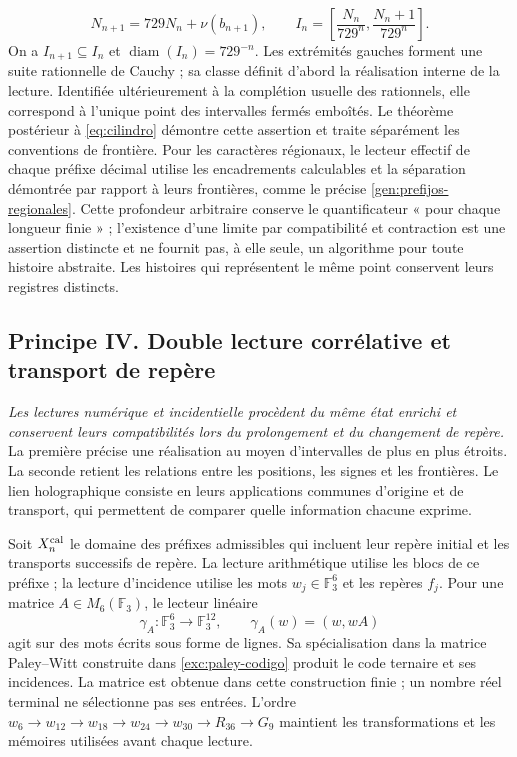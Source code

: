 \[
 N_{n+1}=729N_n+\nu(b_{n+1}),\qquad
 I_n=\left[\frac{N_n}{729^n},\frac{N_n+1}{729^n}\right].
\]
On a \(I_{n+1}\subseteq I_n\) et
\(\operatorname{diam}(I_n)=729^{-n}\). Les extrémités gauches forment
une suite rationnelle de Cauchy ; sa classe définit d’abord la réalisation
interne de la lecture. Identifiée ultérieurement à la complétion
usuelle des rationnels, elle correspond à l’unique point des intervalles
fermés emboîtés. Le théorème postérieur à \eqref{eq:cilindro} démontre
cette assertion et traite séparément les conventions de frontière. Pour
les caractères régionaux, le lecteur effectif de chaque préfixe décimal
utilise les encadrements calculables et la séparation démontrée par rapport à
leurs frontières, comme le précise \cref{gen:prefijos-regionales}. Cette profondeur
arbitraire conserve le quantificateur « pour chaque longueur finie » ;
l’existence d’une limite par compatibilité et contraction est une assertion
distincte et ne fournit pas, à elle seule, un algorithme pour toute histoire
abstraite. Les histoires qui représentent le même point conservent leurs
registres distincts.

\subsection*{Principe IV. Double lecture corrélative et transport de repère
}
\hypertarget{prinh:doble}{}

\emph{Les lectures numérique et incidentielle procèdent du même état
enrichi et conservent leurs compatibilités lors du prolongement et du changement de
repère.} La première précise une réalisation au moyen d’intervalles de plus en plus
étroits. La seconde retient les relations entre les positions, les signes et les
frontières. Le lien holographique consiste en leurs applications communes d’origine et de
transport, qui permettent de comparer quelle information chacune exprime.

Soit \(X_n^{\rm cal}\) le domaine des préfixes admissibles qui incluent leur repère initial et les transports successifs de repère. La lecture arithmétique utilise les blocs de ce préfixe ; la lecture d'incidence utilise les mots \(w_j\in\mathbb F_3^6\) et les repères \(f_j\). Pour une matrice \(A\in M_6(\mathbb F_3)\), le lecteur linéaire
\[
 \gamma_A:\mathbb F_3^6\longrightarrow\mathbb F_3^{12},
 \qquad \gamma_A(w)=(w,wA)
\]
agit sur des mots écrits sous forme de lignes. Sa spécialisation dans la matrice
Paley--Witt construite dans \cref{exc:paley-codigo} produit le code
ternaire et ses incidences. La matrice est obtenue dans cette construction
finie ; un nombre réel terminal ne sélectionne pas ses entrées. L’ordre
\(w_6\to w_{12}\to w_{18}\to w_{24}\to w_{30}\to R_{36}\to G_9\)
maintient les transformations et les mémoires utilisées avant chaque lecture.


